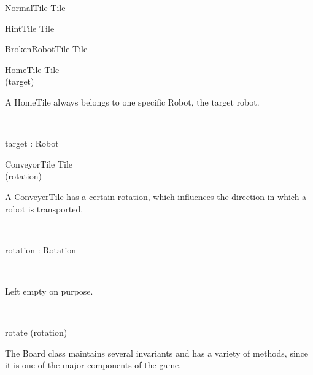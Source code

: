 \documentclass[12pt]{article}
\begin{document}
\begin{class}{NormalTile}
Tile
\end{class}

\begin{class}{HintTile}
Tile
\end{class}

\begin{class}{BrokenRobotTile}
Tile
\end{class}

\begin{class}{HomeTile}
Tile \\
\upharpoonright (target) \\
\begin{classcom}
A HomeTile always belongs to one specific Robot, the target robot.
\end{classcom} \\
\begin{state}
target : Robot
\end{state}
\end{class}

\begin{class}{ConveyorTile}
Tile \\
\upharpoonright (rotation) \\
\begin{classcom}
A ConveyerTile has a certain rotation, which influences the direction in which a robot is transported.
\end{classcom} \\
\begin{state}
rotation : Rotation
\end{state} \\
\begin{classcom}
Left empty on purpose.
\end{classcom} \\
\begin{schema}{rotate}
\Delta (rotation)
\end{schema}
\end{class}

The Board class maintains several invariants and has a variety of methods, since it is one of the major components of the game.
\end{document}
